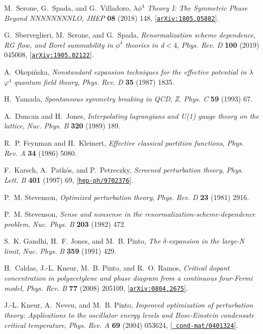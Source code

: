 \documentclass[a4paper,11pt]{article}
\begin{document}
\begin{thebibliography}{10}
M.~Serone, G.~Spada, and G.~Villadoro, {\it {$\lambda \phi^4$ Theory I: The
  Symmetric Phase Beyond NNNNNNNNLO}},  {\em JHEP} {\bf 08} (2018) 148,
  [\href{http://arxiv.org/abs/1805.05882}{{\tt arXiv:1805.05882}}].

G.~Sberveglieri, M.~Serone, and G.~Spada, {\it Renormalization scheme
  dependence, \textrm{RG} flow, and \textrm{Borel} summability in $\phi^4$
  theories in d$<4$},  {\em Phys. Rev. D} {\bf 100} (2019) 045008,
  [\href{http://arxiv.org/abs/1905.02122}{{\tt arXiv:1905.02122}}].

A.~Okopi\'nska, {\it Nonstandard expansion techniques for the effective
  potential in \ensuremath{\lambda}${\ensuremath{\varphi}}^{4}$ quantum field
  theory},  {\em Phys. Rev. D} {\bf 35} (1987) 1835.

H.~Yamada, {\it {Spontaneous symmetry breaking in QCD}},  {\em Z. Phys. C} {\bf
  59} (1993) 67.

A.~Duncan and H.~Jones, {\it Interpolating lagrangians and \textrm{U}(1) gauge
  theory on the lattice},  {\em Nuc. Phys. B} {\bf 320} (1989) 189.

R.~P. Feynman and H.~Kleinert, {\it Effective classical partition functions},
  {\em Phys. Rev. A} {\bf 34} (1986) 5080.

F.~Karsch, A.~Patk\'os, and P.~Petreczky, {\it Screened perturbation theory},
  {\em Phys. Lett. B} {\bf 401} (1997) 69,
  [\href{http://arxiv.org/abs/hep-ph/9702376}{{\tt hep-ph/9702376}}].

P.~M. Stevenson, {\it Optimized perturbation theory},  {\em Phys. Rev. D} {\bf
  23} (1981) 2916.

P.~M. Stevenson, {\it Sense and nonsense in the
  renormalization-scheme-dependence problem},  {\em Nuc. Phys. B} {\bf 203}
  (1982) 472.

S.~K. Gandhi, H.~F. Jones, and M.~B. Pinto, {\it The $\delta$-expansion in the
  large-\textrm{N} limit},  {\em Nuc. Phys. B} {\bf 359} (1991) 429.

H.~Caldas, J.-L. Kneur, M.~B. Pinto, and R.~O. Ramos, {\it Critical dopant
  concentration in polyacetylene and phase diagram from a continuous
  four-\textrm{Fermi} model},  {\em Phys. Rev. B} {\bf 77} (2008) 205109,
  [\href{http://arxiv.org/abs/0804.2675}{{\tt arXiv:0804.2675}}].

J.-L. Kneur, A.~Neveu, and M.~B. Pinto, {\it Improved optimization of
  perturbation theory: Applications to the oscillator energy levels and
  \textrm{Bose-Einstein} condensate critical temperature},  {\em Phys. Rev. A}
  {\bf 69} (2004) 053624, [\href{http://arxiv.org/abs/cond-mat/0401324}{{\tt
  cond-mat/0401324}}].


\end{thebibliography}
\end{document}
